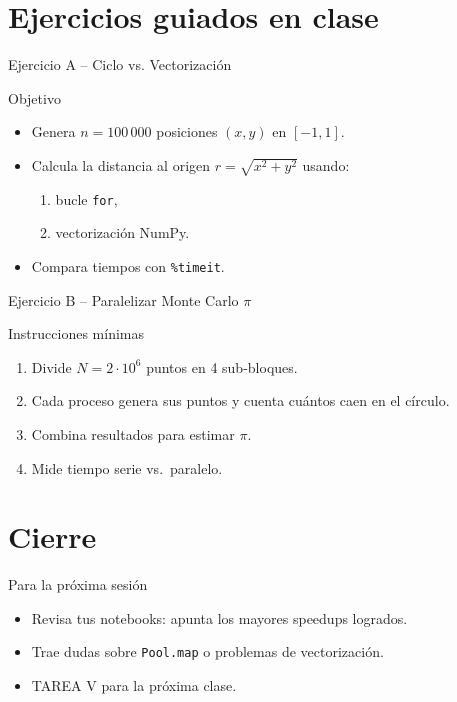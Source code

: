 \documentclass[10pt]{beamer}
\begin{document}
\section{Ejercicios guiados en clase}
\begin{frame}{Ejercicio A – Ciclo vs. Vectorización}
\begin{block}{Objetivo}
  \begin{itemize}
    \item Genera \(n=100\,000\) posiciones \((x,y)\) en \([-1,1]\).
    \item Calcula la distancia al origen \(r=\sqrt{x^2+y^2}\) usando:
      \begin{enumerate}
        \item bucle \texttt{for},
        \item vectorización NumPy.
      \end{enumerate}
    \item Compara tiempos con \texttt{\%timeit}.
  \end{itemize}
\end{block}
\end{frame}

\begin{frame}{Ejercicio B – Paralelizar Monte Carlo \(\pi\)}
\begin{block}{Instrucciones mínimas}
  \begin{enumerate}
    \item Divide \(N=2\cdot10^6\) puntos en 4 sub-bloques.
    \item Cada proceso genera sus puntos y cuenta cuántos caen en el círculo.
    \item Combina resultados para estimar \(\pi\).
    \item Mide tiempo serie vs.\ paralelo.
  \end{enumerate}
\end{block}
\end{frame}

\section{Cierre}
\begin{frame}{Para la próxima sesión}
\begin{itemize}
  \item Revisa tus notebooks: apunta los mayores speedups logrados.  
  \item Trae dudas sobre \texttt{Pool.map} o problemas de vectorización.  
  \item \alert{TAREA V} para la próxima clase.  
\end{itemize}
\end{frame}
\end{document}
